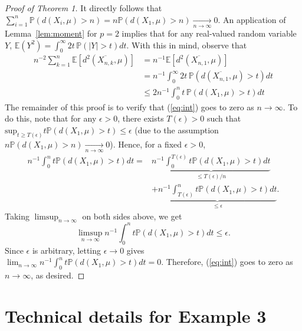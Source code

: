 \documentclass[preprint]{imsart}
\theoremstyle{plain}
\theoremstyle{remark}
\begin{document}
\begin{appendix}
\begin{proof}[Proof of Theorem 1]
It directly follows that $\sum_{i=1}^{n} \mathbb{P}(d(X_i, \mu) > n) = n \mathbb{P}(d(X_1, \mu) > n)\underset{n \to \infty}{\to} 0$. An application of Lemma~\ref{lem:moment} for $p=2$ implies that for any real-valued random variable $Y$, $\mathbb{E}(Y^2)=\int_{0}^{\infty} 2t\,\mathbb{P}(|Y|>t)dt$. With this in mind, observe that
\begin{align}\label{eq:int}
n^{-2}\sum_{k=1}^{n}\mathbb{E}[d^2(\overline{X_{n,k}},\mu)] &= n^{-1}\mathbb{E}[d^2(\overline{X_{n,1}}, \mu)] \nonumber \\
&=n^{-1} \int_{0}^{\infty} 2t\, \mathbb{P}(d(\overline{X_{n,1}}, \mu) > t)dt \nonumber \\
&\le 2n^{-1}\int_{0}^{n}t\, \mathbb{P}(d(X_1, \mu) > t)dt 
\end{align}
The remainder of this proof is to verify that (\ref{eq:int}) goes to zero as $n \to \infty$. To do this, note that for any $\epsilon > 0$, there exists $T(\epsilon)>0$ such that $\mbox{sup}_{t\ge T(\epsilon)} t\mathbb{P}(d(X_1, \mu) > t) \le \epsilon$ (due to the assumption $n\mathbb{P}(d(X_1, \mu) > n) \underset{n \to \infty}{\to} 0$). Hence, for a fixed $\epsilon > 0$,
\begin{align*}
n^{-1}\int_{0}^{n} t\mathbb{P}(d(X_1, \mu) > t)dt =& \underbrace{n^{-1}\int_{0}^{T(\epsilon)} t\mathbb{P}(d(X_1, \mu) > t)dt}_{\le T(\epsilon)/n} \\ 
&+ \underbrace{n^{-1}\int_{T(\epsilon)}^{n} t\mathbb{P}(d(X_1, \mu) > t)dt}_{\le \epsilon}. 
\end{align*}
Taking $\limsup_{n\to \infty}$ on both sides above, we get 
\[
\limsup_{n\to\infty}n^{-1}\int_{0}^{n} t\mathbb{P}(d(X_1, \mu) > t)dt \le \epsilon.  
\]
Since $\epsilon$ is arbitrary, letting $\epsilon \to 0$ gives $\lim_{n\to\infty}n^{-1}\int_{0}^{n} t\mathbb{P}(d(X_1, \mu) > t)dt = 0$. Therefore, (\ref{eq:int}) goes to zero as $n\to\infty$, as desired.
\end{proof}
 



\section{Technical details for Example 3}


\end{appendix}
\end{document}
